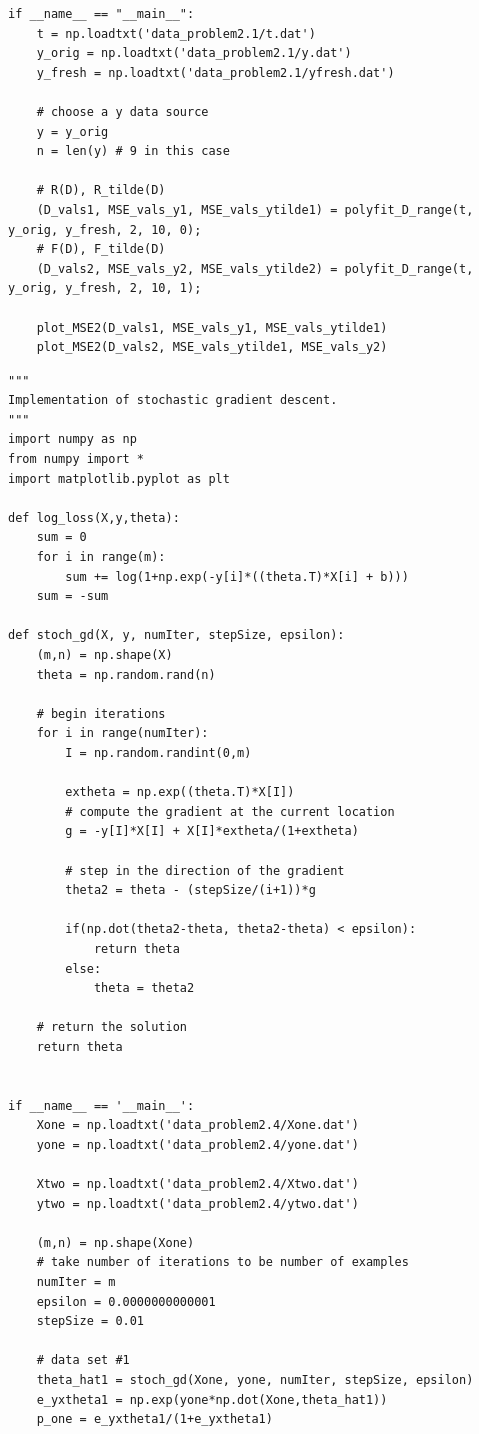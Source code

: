 \documentclass[11pt]{article}
\begin{document}
\begin{lstlisting}
if __name__ == "__main__":
	t = np.loadtxt('data_problem2.1/t.dat')
	y_orig = np.loadtxt('data_problem2.1/y.dat')
	y_fresh = np.loadtxt('data_problem2.1/yfresh.dat')

	# choose a y data source
	y = y_orig
	n = len(y) # 9 in this case

	# R(D), R_tilde(D)
	(D_vals1, MSE_vals_y1, MSE_vals_ytilde1) = polyfit_D_range(t, y_orig, y_fresh, 2, 10, 0);
	# F(D), F_tilde(D)
	(D_vals2, MSE_vals_y2, MSE_vals_ytilde2) = polyfit_D_range(t, y_orig, y_fresh, 2, 10, 1);

	plot_MSE2(D_vals1, MSE_vals_y1, MSE_vals_ytilde1)
	plot_MSE2(D_vals2, MSE_vals_ytilde1, MSE_vals_y2)

\end{lstlisting}

\begin{lstlisting}
"""
Implementation of stochastic gradient descent.
"""
import numpy as np
from numpy import *
import matplotlib.pyplot as plt

def log_loss(X,y,theta):
    sum = 0
    for i in range(m):
        sum += log(1+np.exp(-y[i]*((theta.T)*X[i] + b)))
    sum = -sum

def stoch_gd(X, y, numIter, stepSize, epsilon):
    (m,n) = np.shape(X)
    theta = np.random.rand(n)

    # begin iterations
    for i in range(numIter):
        I = np.random.randint(0,m)

        extheta = np.exp((theta.T)*X[I])
        # compute the gradient at the current location
        g = -y[I]*X[I] + X[I]*extheta/(1+extheta)

        # step in the direction of the gradient
        theta2 = theta - (stepSize/(i+1))*g

        if(np.dot(theta2-theta, theta2-theta) < epsilon):
            return theta
        else:
            theta = theta2

    # return the solution
    return theta


if __name__ == '__main__':
    Xone = np.loadtxt('data_problem2.4/Xone.dat')
    yone = np.loadtxt('data_problem2.4/yone.dat')

    Xtwo = np.loadtxt('data_problem2.4/Xtwo.dat')
    ytwo = np.loadtxt('data_problem2.4/ytwo.dat')

    (m,n) = np.shape(Xone)
    # take number of iterations to be number of examples
    numIter = m
    epsilon = 0.0000000000001
    stepSize = 0.01

    # data set #1
    theta_hat1 = stoch_gd(Xone, yone, numIter, stepSize, epsilon)
    e_yxtheta1 = np.exp(yone*np.dot(Xone,theta_hat1))
    p_one = e_yxtheta1/(1+e_yxtheta1)


\end{lstlisting}
\end{document}
